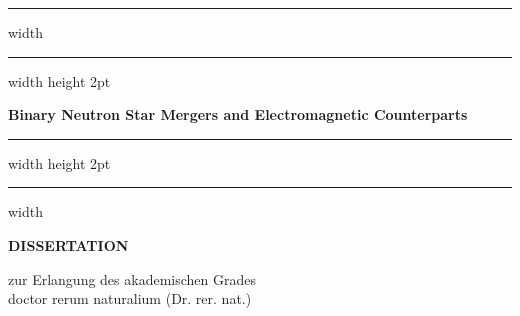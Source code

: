 \documentclass[
openright,
12pt, %
english,%
onehalfspacing, %
nolistspacing, %
nohyperref, %
headsepline, %
]{MastersDoctoralThesis} %
\begin{document}
\frontmatter %
\pagestyle{plain} %


\begin{titlepage}
    \begin{center}
        \centering
        {\hrule width \hsize \kern 1mm \hrule width \hsize height 2pt}
        \vspace{5mm}
        \huge 
        \textbf{Binary Neutron Star Mergers and Electromagnetic Counterparts}\\
        \vspace{5mm}
        {\hrule width \hsize height 2pt \kern 1mm  \hrule width \hsize }
        
        \vspace{1.4cm}
        
        \LARGE 
        \textbf{DISSERTATION} 
        
        \vspace{0.60cm}
        
        \large
        zur Erlangung des akademischen Grades\\
        doctor rerum naturalium (Dr. rer. nat.)
        \vspace{0.8cm}
        

\end{center}
\end{titlepage}
\end{document}
